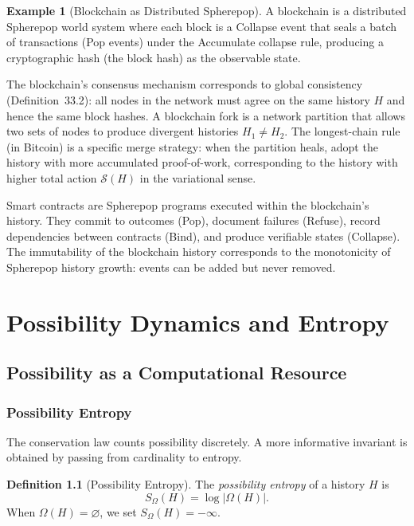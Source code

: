 \documentclass[12pt, a4paper, openany]{book}
\theoremstyle{plain}
\theoremstyle{definition}
\newtheorem{definition}[theorem]{Definition}
\newtheorem{example}[theorem]{Example}
\theoremstyle{remark}
\begin{document}
\begin{example}[Blockchain as Distributed Spherepop]
A blockchain is a distributed Spherepop world system where each block is a
Collapse event that seals a batch of transactions (Pop events) under the
Accumulate collapse rule, producing a cryptographic hash (the block hash)
as the observable state.

The blockchain's consensus mechanism corresponds to global consistency (Definition~33.2):
all nodes in the network must agree on the same history $H$ and hence the same
block hashes. A blockchain fork is a network partition that allows two sets of
nodes to produce divergent histories $H_1 \neq H_2$. The longest-chain rule
(in Bitcoin) is a specific merge strategy: when the partition heals, adopt
the history with more accumulated proof-of-work, corresponding to the history
with higher total action $\mathcal{S}(H)$ in the variational sense.

Smart contracts are Spherepop programs executed within the blockchain's history.
They commit to outcomes (Pop), document failures (Refuse), record dependencies
between contracts (Bind), and produce verifiable states (Collapse). The
immutability of the blockchain history corresponds to the monotonicity of
Spherepop history growth: events can be added but never removed.
\end{example}


\part{Possibility Dynamics and Entropy}

\chapter{Possibility as a Computational Resource}

\section{Possibility Entropy}

The conservation law counts possibility discretely. A more informative invariant
is obtained by passing from cardinality to entropy.

\begin{definition}[Possibility Entropy]
The \emph{possibility entropy} of a history $H$ is
\[
S_\Omega(H) = \log |\Omega(H)|.
\]
When $\Omega(H) = \varnothing$, we set $S_\Omega(H) = -\infty$.
\end{definition}
\end{document}
